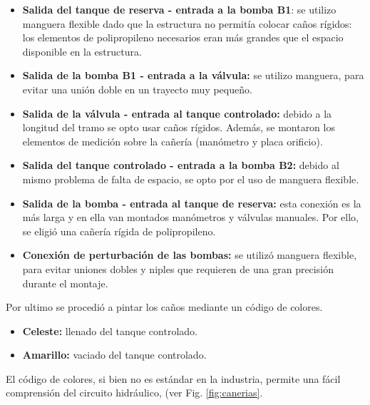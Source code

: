 \begin{itemize}
  \item \textbf{Salida del tanque de reserva - entrada a la bomba B1}:
  se utilizo manguera flexible dado que la estructura no permitía colocar caños
  rígidos: los elementos de polipropileno necesarios eran más grandes que el
  espacio disponible en la estructura.

  \item \textbf{Salida de la bomba B1 - entrada a la válvula:}
  se utilizo manguera, para evitar una unión doble en un trayecto muy pequeño.
  
  \item \textbf{Salida de la válvula - entrada al tanque controlado:}
  debido a la longitud del tramo se opto usar caños rígidos.
  Además, se montaron los elementos de medición sobre la cañería (manómetro y
  placa orificio).
  
  \item \textbf{Salida del tanque controlado - entrada a la bomba B2:}
  debido al mismo problema de falta de espacio, se opto por el uso de manguera
  flexible.
  
  \item \textbf{Salida de la bomba - entrada al tanque de reserva:}
  esta conexión es la más larga y en ella van montados manómetros y
  válvulas manuales. Por ello, se eligió una cañería rígida de polipropileno.

  \item \textbf{Conexión de perturbación de las bombas:}
  se utilizó manguera flexible, para evitar uniones dobles y
  niples que requieren de una gran precisión durante el montaje.
 \end{itemize}

Por ultimo se procedió a pintar los caños mediante un código de colores.
 \begin{itemize}
  \item {\color{Cerulean} \textbf{Celeste:}} llenado del tanque controlado.
  \item {\color{YellowOrange} \textbf{Amarillo:}} vaciado del tanque controlado.
 \end{itemize}
El código de colores, si bien no es estándar en la industria, permite una fácil
comprensión del circuito hidráulico, (ver Fig. \ref{fig:canerias}.

